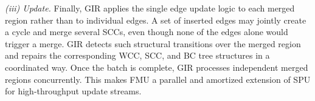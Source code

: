 \textit{(iii) Update.}
Finally, GIR applies the single edge update logic to each merged region rather than to individual edges.
A set of inserted edges may jointly create a cycle and merge several SCCs, even though none of the edges alone would trigger a merge.
GIR detects such structural transitions over the merged region and repairs the corresponding WCC, SCC, and BC tree structures in a coordinated way.
Once the batch is complete, GIR processes independent merged regions concurrently.
This makes FMU a parallel and amortized extension of SPU for high-throughput update streams.











